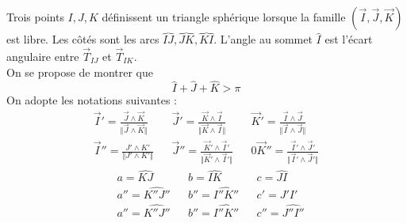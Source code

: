 Trois points $I,J,K$ d{\'e}finissent un triangle sph{\'e}rique lorsque la famille $(\overrightarrow I, \overrightarrow J,  \overrightarrow K)$ est libre. Les c{\^o}t{\'e}s sont les arcs $\overbrace{IJ},\overbrace{JK},\overbrace{KI}$. L'angle au sommet $\widehat{I}$
est l'{\'e}cart angulaire entre $\overrightarrow{T}_{IJ}$ et $\overrightarrow{T}_{IK}$.\\
On se propose de montrer que
\[
\widehat{I}+\widehat{J}+\widehat{K}>\pi
\]
On adopte les notations suivantes :
\begin{align*}
\overrightarrow I' = \frac{\overrightarrow J\wedge \overrightarrow K}{\Vert \overrightarrow J\wedge \overrightarrow K \Vert } & &
\overrightarrow J' = \frac{\overrightarrow K\wedge \overrightarrow I}{\Vert \overrightarrow K\wedge \overrightarrow I\Vert }  & &
\overrightarrow K' = \frac{\overrightarrow I\wedge \overrightarrow J}{\Vert \overrightarrow I\wedge \overrightarrow J\Vert } \\
\overrightarrow I'' = \frac{J'\wedge K'}{\Vert J'\wedge K'\Vert }& &
\overrightarrow J'' = \frac{\overrightarrow K'\wedge \overrightarrow I'}{\Vert \overrightarrow K'\wedge \overrightarrow I'\Vert }& &0
\overrightarrow K'' = \frac{\overrightarrow I'\wedge \overrightarrow J'}{\Vert \overrightarrow I'\wedge \overrightarrow J'\Vert }
\end{align*}
\begin{align*}
&a =\widehat{KJ} & & b=\widehat{IK} & & c=\widehat{JI} \\
&a'' =\widehat{K''J''} & & b''=\widehat{I''K''} & & c'=\widehat{J'I'} \\
&a'' =\widehat{K''J''} & & b''=\widehat{I''K''} & & c''=\widehat{J''I''}
\end{align*}

